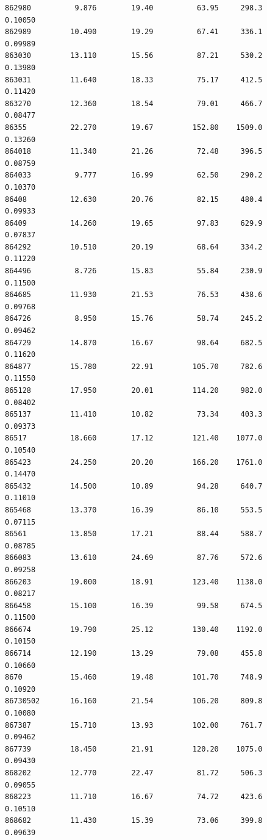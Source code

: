 \documentclass[
  letterpaper,
  DIV=11,
  numbers=noendperiod]{scrartcl}
\begin{document}
\begin{verbatim}
862980          9.876        19.40          63.95     298.3         0.10050
862989         10.490        19.29          67.41     336.1         0.09989
863030         13.110        15.56          87.21     530.2         0.13980
863031         11.640        18.33          75.17     412.5         0.11420
863270         12.360        18.54          79.01     466.7         0.08477
86355          22.270        19.67         152.80    1509.0         0.13260
864018         11.340        21.26          72.48     396.5         0.08759
864033          9.777        16.99          62.50     290.2         0.10370
86408          12.630        20.76          82.15     480.4         0.09933
86409          14.260        19.65          97.83     629.9         0.07837
864292         10.510        20.19          68.64     334.2         0.11220
864496          8.726        15.83          55.84     230.9         0.11500
864685         11.930        21.53          76.53     438.6         0.09768
864726          8.950        15.76          58.74     245.2         0.09462
864729         14.870        16.67          98.64     682.5         0.11620
864877         15.780        22.91         105.70     782.6         0.11550
865128         17.950        20.01         114.20     982.0         0.08402
865137         11.410        10.82          73.34     403.3         0.09373
86517          18.660        17.12         121.40    1077.0         0.10540
865423         24.250        20.20         166.20    1761.0         0.14470
865432         14.500        10.89          94.28     640.7         0.11010
865468         13.370        16.39          86.10     553.5         0.07115
86561          13.850        17.21          88.44     588.7         0.08785
866083         13.610        24.69          87.76     572.6         0.09258
866203         19.000        18.91         123.40    1138.0         0.08217
866458         15.100        16.39          99.58     674.5         0.11500
866674         19.790        25.12         130.40    1192.0         0.10150
866714         12.190        13.29          79.08     455.8         0.10660
8670           15.460        19.48         101.70     748.9         0.10920
86730502       16.160        21.54         106.20     809.8         0.10080
867387         15.710        13.93         102.00     761.7         0.09462
867739         18.450        21.91         120.20    1075.0         0.09430
868202         12.770        22.47          81.72     506.3         0.09055
868223         11.710        16.67          74.72     423.6         0.10510
868682         11.430        15.39          73.06     399.8         0.09639

\end{verbatim}
\end{document}
